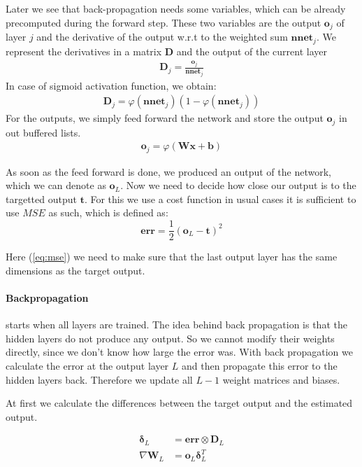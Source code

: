 \documentclass{acm_proc_article-sp}
\begin{document}
Later we see that back-propagation needs some variables, which can be already precomputed during the forward step. These two variables are the output $\mathbf{o}_j$ of layer $j$ and the derivative of the output w.r.t to the weighted sum $\mathbf{nnet}_j$. We represent the derivatives in a matrix $\mathbf{D}$ and the output of the current layer 
\begin{align}
\mathbf{D}_j = \frac{\mathbf{o}_j}{\mathbf{nnet}_j}
\end{align}
In case of sigmoid activation function, we obtain:
\begin{align}
\mathbf{D}_j = \varphi \left( \mathbf{nnet}_j \right) \left( 1 - \varphi \left(\mathbf{nnet}_j \right) \right)
\end{align}
For the outputs, we simply feed forward the network and store the output $\mathbf{o}_j$ in out buffered lists.
\begin{align}
\mathbf{o}_j = \varphi \left( \mathbf{Wx+b} \right)
\end{align}

As soon as the feed forward is done, we produced an output of the network, which we can denote as $\mathbf{o}_L$. Now we need to decide how close our output is to the targetted output $\mathbf{t}$. For this we use a cost function in usual cases it is sufficient to use $MSE$ as such, which is defined as:
\begin{equation}
\label{eq:mse}
\mathbf{err} = \frac{1}{2} \left( \mathbf{o}_L - \mathbf{t} \right) ^2
\end{equation}

Here (\ref{eq:mse}) we need to make sure that the last output layer has the same dimensions as the target output.


\paragraph{Backpropagation} starts when all layers are trained. The idea behind back propagation is that the hidden layers do not produce any output. So we cannot modify their weights directly, since we don’t know how large the error was. With back propagation we calculate the error at the output layer $L$ and then propagate this error to the hidden layers back. Therefore we update all $L-1$ weight matrices and biases.

At first we calculate the differences between the target output and the estimated output.

\begin{align}
\boldsymbol{\delta}_L &= \mathbf{err} \otimes \mathbf{D}_L\\
\nabla \mathbf{W}_L &= \mathbf{o}_L \boldsymbol{\delta}_L^T
\end{align}
\end{document}
